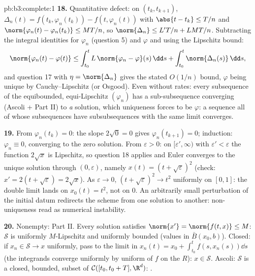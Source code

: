 \begin{solution}{pb:b3:complete:1}
\textbf{18.} Quantitative defect: on $(t_k, t_{k+1})$,
$\Delta_n(t) = f(t_k, \varphi_n(t_k)) - f(t, \varphi_n(t))$
with $\abs{t - t_k} \leq T/n$ and $\norm{\varphi_n(t) -
\varphi_n(t_k)} \leq MT/n$, so $\norm{\Delta_n} \leq L'T/n +
LMT/n$. Subtracting the integral identities for $\varphi_n$
(question 5) and $\varphi$ and using the Lipschitz bound:
\[
\norm{\varphi_n(t) - \varphi(t)} \leq
\int_{t_0}^t L\,\norm{\varphi_n - \varphi}(s)\,\dd s +
\int_{t_0}^t\norm{\Delta_n(s)}\,\dd s,
\]
and question 17 with $\eta = \norm{\Delta_n}$ gives the
stated $O(1/n)$ bound, $\varphi$ being unique by
Cauchy--Lipschitz (or Osgood). Even without rates: every
subsequence of the equibounded, equi-Lipschitz $(\varphi_n)$
has a sub-subsequence converging (Ascoli + Part II) to
\emph{a} solution, which uniqueness forces to be $\varphi$:
a sequence all of whose subsequences have subsubsequences
with the same limit converges.

\textbf{19.} From $\varphi_n(t_k) = 0$: the slope $2\sqrt0 =
0$ gives $\varphi_n(t_{k+1}) = 0$; induction: $\varphi_n
\equiv 0$, converging to the zero solution. From
$\varepsilon > 0$: on $[\varepsilon', \infty)$ with
$\varepsilon' < \varepsilon$ the function $2\sqrt x$ is
Lipschitz, so question 18 applies and Euler converges to the
unique solution through $(0, \varepsilon)$, namely $x(t) =
(t + \sqrt\varepsilon)^2$ (check: $x' = 2(t + \sqrt
\varepsilon) = 2\sqrt x$). As $\varepsilon \to 0$, $(t +
\sqrt\varepsilon)^2 \to t^2$ uniformly on $[0,1]$: the double
limit lands on $x_0(t) = t^2$, not on $0$. An arbitrarily
small perturbation of the initial datum redirects the scheme
from one solution to another: non-uniqueness read as
numerical instability.

\textbf{20.} Nonempty: Part II. Every solution satisfies
$\norm{x'} = \norm{f(t, x)} \leq M$: $\mathcal S$ is
uniformly $M$-Lipschitz and uniformly bounded (values in
$\bar B(x_0, b)$). Closed: if $x_n \in \mathcal S \to x$
uniformly, pass to the limit in $x_n(t) = x_0 +
\int_{t_0}^tf(s, x_n(s))\dd s$ (the integrands converge
uniformly by uniform  of $f$ on the  $R$):
$x \in \mathcal S$. Ascoli: $\mathcal S$ is a closed,
bounded,  subset of $\mathcal C([t_0, t_0+T],
\R^d)$: .


\end{solution}
